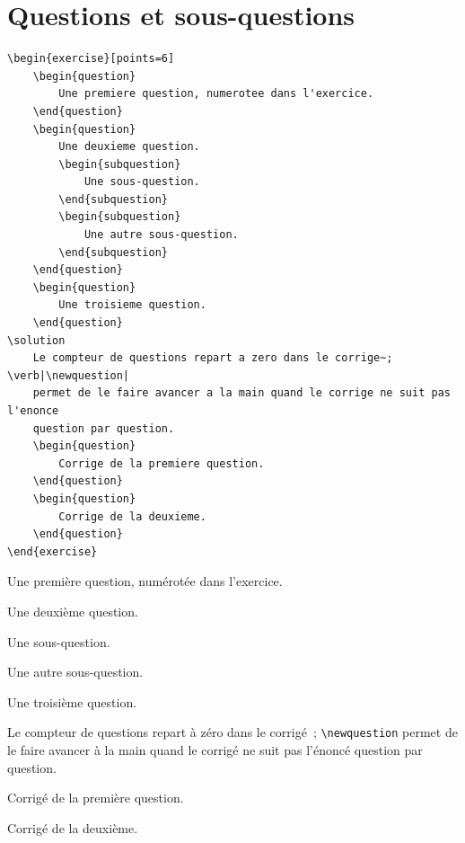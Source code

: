 \section{Questions et sous-questions}%
\label{sec:questions}

\begin{lstlisting}
\begin{exercise}[points=6]
    \begin{question}
        Une premiere question, numerotee dans l'exercice.
    \end{question}
    \begin{question}
        Une deuxieme question.
        \begin{subquestion}
            Une sous-question.
        \end{subquestion}
        \begin{subquestion}
            Une autre sous-question.
        \end{subquestion}
    \end{question}
    \begin{question}
        Une troisieme question.
    \end{question}
\solution
    Le compteur de questions repart a zero dans le corrige~; \verb|\newquestion|
    permet de le faire avancer a la main quand le corrige ne suit pas l'enonce
    question par question.
    \begin{question}
        Corrige de la premiere question.
    \end{question}
    \begin{question}
        Corrige de la deuxieme.
    \end{question}
\end{exercise}
\end{lstlisting}
\begin{exercise}[points=6]
    \begin{question}
        Une première question, numérotée dans l'exercice.
    \end{question}
    \begin{question}
        Une deuxième question.
        \begin{subquestion}
            Une sous-question.
        \end{subquestion}
        \begin{subquestion}
            Une autre sous-question.
        \end{subquestion}
    \end{question}
    \begin{question}
        Une troisième question.
    \end{question}
\solution
    Le compteur de questions repart à zéro dans le corrigé~; \verb|\newquestion|
    permet de le faire avancer à la main quand le corrigé ne suit pas l'énoncé
    question par question.
    \begin{question}
        Corrigé de la première question.
    \end{question}
    \begin{question}
        Corrigé de la deuxième.
    \end{question}
\end{exercise}

